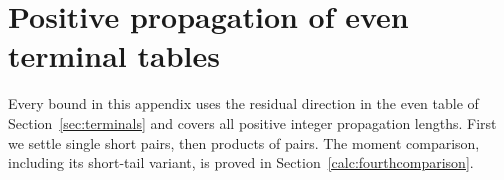 \section{Positive propagation of even terminal tables}\label{app:even-propagation}
Every bound in this appendix uses the residual direction in the even table of Section~\ref{sec:terminals} and covers all positive integer propagation lengths. First we settle single short pairs, then products of pairs. The moment comparison, including its short-tail variant, is proved in Section~\ref{calc:fourthcomparison}.









